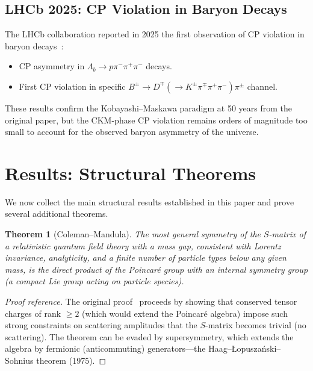 \documentclass[12pt]{article}
\newtheorem{theorem}{Theorem}[section]
\theoremstyle{definition}
\theoremstyle{remark}
\begin{document}
\subsection{LHCb 2025: CP Violation in Baryon Decays}

The LHCb collaboration reported in 2025 the first observation of CP violation in baryon decays~\cite{LHCb2025}:
\begin{itemize}
    \item CP asymmetry in $\Lambda_b \to p\pi^-\pi^+\pi^-$ decays.
    \item First CP violation in specific $B^\pm \to D^\mp (\to K^\pm\pi^\mp\pi^+\pi^-)\pi^\pm$ channel.
\end{itemize}
These results confirm the Kobayashi--Maskawa paradigm at 50 years from the original paper, but the CKM-phase CP violation remains orders of magnitude too small to account for the observed baryon asymmetry of the universe.

\section{Results: Structural Theorems}
\label{sec:results}

We now collect the main structural results established in this paper and prove several additional theorems.

\begin{theorem}[Coleman--Mandula]
\label{thm:colemanmandula}
The most general symmetry of the $S$-matrix of a relativistic quantum field theory with a mass gap, consistent with Lorentz invariance, analyticity, and a finite number of particle types below any given mass, is the direct product of the Poincar\'{e} group with an internal symmetry group (a compact Lie group acting on particle species).
\end{theorem}

\begin{proof}[Proof reference]
The original proof~\cite{ColemanMandula1967} proceeds by showing that conserved tensor charges of rank $\geq 2$ (which would extend the Poincar\'{e} algebra) impose such strong constraints on scattering amplitudes that the $S$-matrix becomes trivial (no scattering). The theorem can be evaded by supersymmetry, which extends the algebra by fermionic (anticommuting) generators---the Haag--{\L}opusza\'{n}ski--Sohnius theorem (1975).
\end{proof}
\end{document}
